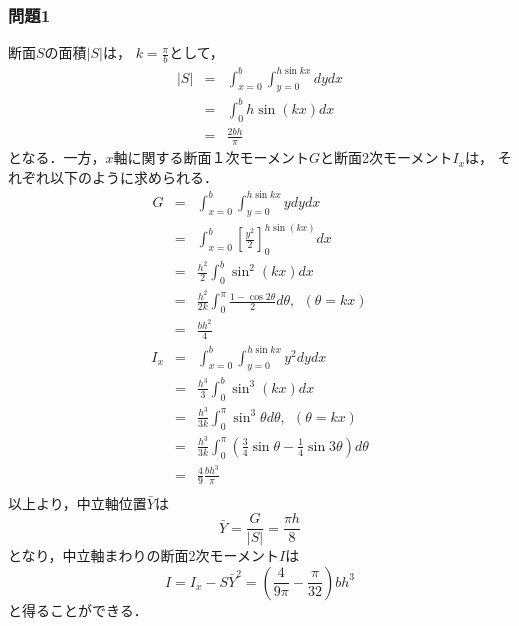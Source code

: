 \documentclass[10pt,a4j]{jarticle}
\begin{document}
\subsubsection*{問題1}
断面$S$の面積$\left| S \right|$は， $k=\frac{\pi}{b}$として，
\begin{eqnarray}
	\left| S\right| &= & \int _{x=0}^b\int _{y=0}^{h\sin kx} dydx   
	\nonumber
	\\
	&=& \int_0^b h\sin(kx) dx 
	\nonumber
	\\
	&=& 
	\frac{2bh}{\pi}
\end{eqnarray}
となる．一方，$x$軸に関する断面１次モーメント$G$と断面2次モーメント$I_x$は，
それぞれ以下のように求められる．
\begin{eqnarray}
	G &=& 
	\int _{x=0}^b\int _{y=0}^{h\sin kx} ydydx   
	\nonumber \\
	&=&
	\int _{x=0}^b\left[ \frac{y^2}{2} \right]_0^{h\sin(kx)}dx   
	\nonumber \\
	&=& \frac{h^2}{2} \int_0^b \sin^2 (kx)dx
	\nonumber \\
	&=& \frac{h^2}{2k} \int_0^\pi \frac{1-\cos2\theta }{2}d\theta, \ \ (\theta=kx) 
	\nonumber \\
	&=& \frac{bh^2}{4}
\end{eqnarray}
\begin{eqnarray}
	I_x &= & 
	\int _{x=0}^b\int _{y=0}^{h\sin kx} y^2dydx   
	\nonumber \\
	&=& \frac{h^3}{3} \int_0^b \sin^3 (kx) dx 
	\nonumber \\
	&=& \frac{h^3}{3k} \int_0^\pi \sin^3 \theta d\theta , \ \ (\theta=kx)
	\nonumber \\
	&=& \frac{h^3}{3k} \int_0^\pi \left( \frac{3}{4}\sin \theta -\frac{1}{4}\sin3\theta \right)d\theta 
	\nonumber \\
	&=& 
	\frac{4}{9} \frac{bh^3}{\pi}
	\\
\end{eqnarray}
以上より，中立軸位置$\bar Y$は
\begin{equation}
	\bar Y = \frac{G}{\left|S\right|}=\frac{\pi h}{8}
\end{equation}
となり，中立軸まわりの断面2次モーメント$I$は
\begin{equation}
	I = I_x -S\bar Y^2 =  \left(\frac{4}{9\pi}-\frac{\pi}{32} \right) bh^3
\end{equation}
と得ることができる．
\end{document}
